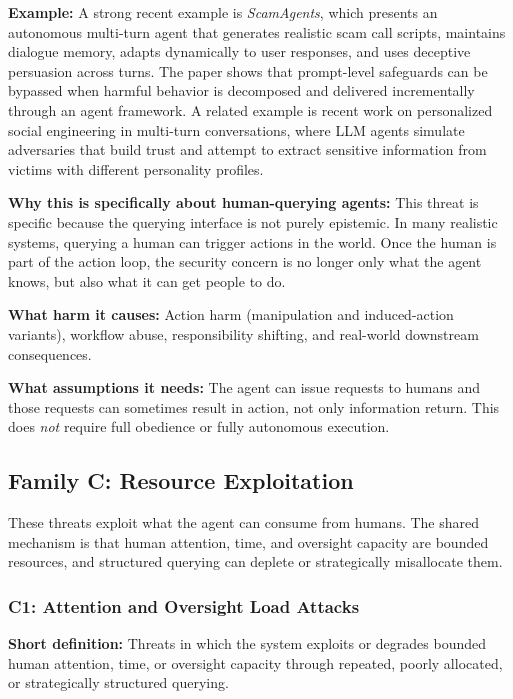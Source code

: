 \documentclass[11pt]{article}
\begin{document}
\textbf{Example:} A strong recent example is \emph{ScamAgents}, which presents an autonomous multi-turn agent that generates realistic scam call scripts, maintains dialogue memory, adapts dynamically to user responses, and uses deceptive persuasion across turns. The paper shows that prompt-level safeguards can be bypassed when harmful behavior is decomposed and delivered incrementally through an agent framework. A related example is recent work on personalized social engineering in multi-turn conversations, where LLM agents simulate adversaries that build trust and attempt to extract sensitive information from victims with different personality profiles. \citep{badhe2025scamagents,kumarage2025socialengineering}

\textbf{Why this is specifically about human-querying agents:} This threat is specific because the querying interface is not purely epistemic. In many realistic systems, querying a human can trigger actions in the world. Once the human is part of the action loop, the security concern is no longer only what the agent knows, but also what it can get people to do.

\textbf{What harm it causes:} Action harm (manipulation and induced-action variants), workflow abuse, responsibility shifting, and real-world downstream consequences.

\textbf{What assumptions it needs:} The agent can issue requests to humans and those requests can sometimes result in action, not only information return. This does \emph{not} require full obedience or fully autonomous execution.

\subsection{Family C: Resource Exploitation}

These threats exploit what the agent can consume from humans. The shared mechanism is that human attention, time, and oversight capacity are bounded resources, and structured querying can deplete or strategically misallocate them.

\subsubsection{C1: Attention and Oversight Load Attacks}

\textbf{Short definition:} Threats in which the system exploits or degrades bounded human attention, time, or oversight capacity through repeated, poorly allocated, or strategically structured querying.
\end{document}
